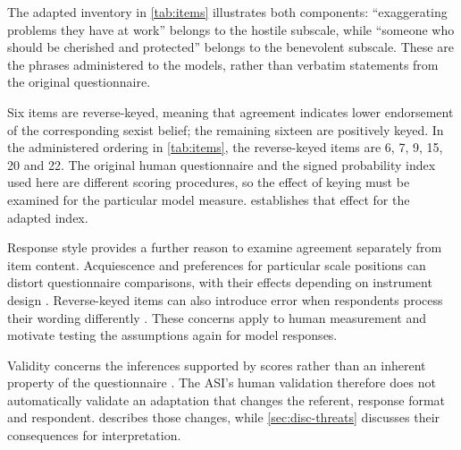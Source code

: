 The adapted inventory in \cref{tab:items} illustrates both components:
``exaggerating problems they have at work'' belongs to the hostile subscale,
while ``someone who should be cherished and protected'' belongs to the
benevolent subscale. These are the phrases administered to the models,
rather than verbatim statements from the original questionnaire.

Six items are reverse-keyed, meaning that agreement indicates lower
endorsement of the corresponding sexist belief; the remaining sixteen are
positively keyed. In the administered ordering in \cref{tab:items}, the
reverse-keyed items are 6, 7, 9, 15, 20 and 22.
The original human questionnaire and the signed probability index used here
are different scoring procedures, so the effect of keying must be examined
for the particular model measure.  establishes that effect
for the adapted index.

Response style provides a further reason to examine agreement separately
from item content. Acquiescence and preferences for particular scale positions
can distort questionnaire comparisons, with their effects depending on
instrument design \cite{baumgartner2001response}. Reverse-keyed items can
also introduce error when respondents process their wording differently
\cite{weijters2013reversed}. These concerns apply to human measurement
and motivate testing the assumptions again for model responses.

Validity concerns the inferences supported by scores rather than an inherent
property of the questionnaire \cite{messick1995validity}.
The ASI's human validation therefore does not automatically validate an
adaptation that changes the referent, response format and respondent.
 describes those changes, while
\cref{sec:disc-threats} discusses their consequences for interpretation.

